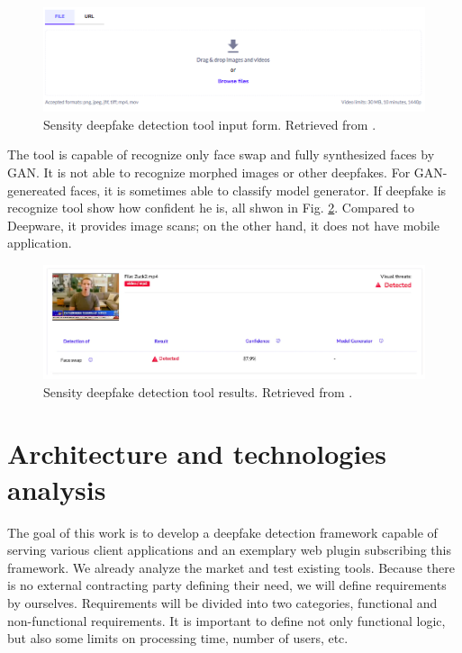 \begin{figure}[H]
    \centering
    \includegraphics[width=.85\linewidth]{other-fig/sensity_input.png}        
    \caption{Sensity deepfake detection tool input form. Retrieved from \cite{HowToDetectADeepfakeOnline}.}
    \label{fig:sensity_input}
\end{figure}

The tool is capable of recognize only face swap and fully synthesized faces by GAN. It is not able to recognize morphed images or other deepfakes. For GAN-genereated faces, it is sometimes able to classify model generator. If deepfake is recognize tool show how confident he is, all shwon in Fig. \ref{fig:sensity_results}. Compared to Deepware, it provides image scans; on the other hand, it does not have mobile application.

\begin{figure}[H]
    \centering
    \includegraphics[width=.9\linewidth]{other-fig/sensity_results.png}        
    \caption{Sensity deepfake detection tool results. Retrieved from \cite{HowToDetectADeepfakeOnline}.}
    \label{fig:sensity_results}
\end{figure}

\chapter{Architecture and technologies analysis}

The goal of this work is to develop a deepfake detection framework capable of serving various client applications and an exemplary web plugin subscribing this framework. We already analyze the market and test existing tools. Because there is no external contracting party defining their need, we will define requirements by ourselves. Requirements will be divided into two categories, functional and non-functional requirements. It is important to define not only functional logic, but also some limits on processing time, number of users, etc.

